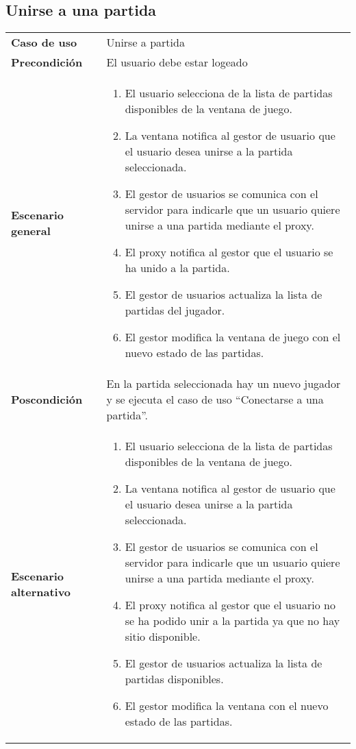 \subsection{Unirse a una partida}
{\footnotesize
\begin{tabularx}{0.95\textwidth}{p{}|X}

\textbf{Caso de uso} & Unirse a partida \\

\textbf{Precondición} & El usuario debe estar logeado \\

\textbf{Escenario general} & \begin{enumerate}
\item El usuario selecciona de la lista de partidas disponibles de la ventana de
juego.
\item La ventana notifica al gestor de usuario que el usuario desea unirse a la
partida seleccionada.
\item El gestor de usuarios se comunica con el servidor para indicarle que un
usuario quiere unirse a una partida mediante el proxy.
\item El proxy notifica al gestor que el usuario se ha unido a la partida.
\item El gestor de usuarios actualiza la lista de partidas del jugador.
\item El gestor modifica la ventana de juego con el nuevo estado de las
partidas.
\end{enumerate} \\

\textbf{Poscondición} & En la partida seleccionada hay un nuevo jugador y se
ejecuta el caso de uso ``Conectarse a una partida''.\\ 

\textbf{Escenario alternativo} & \begin{enumerate}
\item El usuario selecciona de la lista de partidas disponibles de la ventana de
juego.
\item La ventana notifica al gestor de usuario que el usuario desea unirse a la
partida seleccionada.
\item El gestor de usuarios se comunica con el servidor para indicarle que un
usuario quiere unirse a una partida mediante el proxy.
\item El proxy notifica al gestor que el usuario no se ha podido unir a la
partida ya que no hay sitio disponible.
\item El gestor de usuarios actualiza la lista de partidas disponibles.
\item El gestor modifica la ventana con el nuevo estado de las partidas.
\end{enumerate}

\end{tabularx}
}

